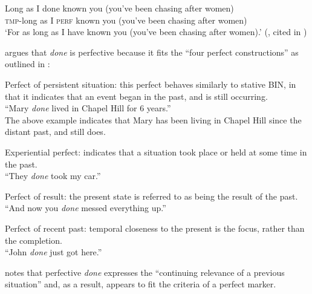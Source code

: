 \documentclass[output=paper,draftmode,colorlinks,citecolor=brown]{langscibook}
\begin{document}
\ea%
    \label{ex:baxter:9}
    \gll Long as I done known you (you’ve been chasing after women) \\
         \textsc{tmp-}long   as I \textsc{perf} known you (you’ve been chasing after women) \\
    \glt ‘For as long as I have known you (you’ve been chasing after women).’ (\citet{Wilson1986}, cited in \citet{Martin2018})
\z


\citet{Terry2010} argues that \textit{done} is perfective because it fits the “four perfect constructions” as outlined in \citet{Comrie1976}:

\ea%
\label{ex:baxter:10}
Perfect of persistent situation: this perfect behaves similarly to stative BIN, in that it indicates that an event began in the past, and is still occurring.\\

“Mary \textit{done} lived in Chapel Hill for 6 years.”\\

The above example indicates that Mary has been living in Chapel Hill since the distant past, and still does.
\z

\ea%
    \label{ex:baxter:11}
    Experiential perfect: indicates that a situation took place or held at some time in the past.\\

“They \textit{done} took my car.”\\
\z

\ea%
    \label{ex:baxter:12}
  Perfect of result: the present state is referred to as being the result of the past. \\

“And now you \textit{done} messed everything up.”\\
\z

\ea%
\label{ex:baxter:13}
 Perfect of recent past: temporal closeness to the present is the focus, rather than the completion.\\
“John \textit{done} just got here.”\\
\z

\citet{Terry2010} notes that perfective \textit{done} expresses the “continuing relevance of a previous situation” \citep[56]{Comrie1976} and, as a result, appears to fit the criteria of a perfect marker.
\end{document}
